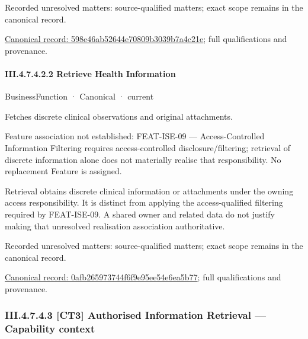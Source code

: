 {\small Recorded unresolved matters: source-qualified matters; exact scope remains in the canonical record.}\par
{\footnotesize \href{../../../../continuum/business/business-function/598e46ab52644e70809b3039b7a4c21e.md}{Canonical record: 598e46ab52644e70809b3039b7a4c21e}; full qualifications and provenance.}\par
\paragraph*{III.4.7.4.2.2 Retrieve Health Information}
\label{navigation:III.4.7.4.2.2}

\label{element:0afb265973744f6f9e95ee54e6ea5b77}
{\small BusinessFunction · Canonical · current}\par

Fetches discrete clinical observations and original attachments.



Feature association not established: FEAT-ISE-09 — Access-Controlled Information Filtering requires access-controlled disclosure/filtering; retrieval of discrete information alone does not materially realise that responsibility. No replacement Feature is assigned.



Retrieval obtains discrete clinical information or attachments under the owning access responsibility. It is distinct from applying the access-qualified filtering required by FEAT-ISE-09. A shared owner and related data do not justify making that unresolved realisation association authoritative.


{\small Recorded unresolved matters: source-qualified matters; exact scope remains in the canonical record.}\par
{\footnotesize \href{../../../../continuum/business/business-function/0afb265973744f6f9e95ee54e6ea5b77.md}{Canonical record: 0afb265973744f6f9e95ee54e6ea5b77}; full qualifications and provenance.}\par
\subsubsection*{III.4.7.4.3 [CT3] Authorised Information Retrieval — Capability context}
\label{navigation:III.4.7.4.3}

